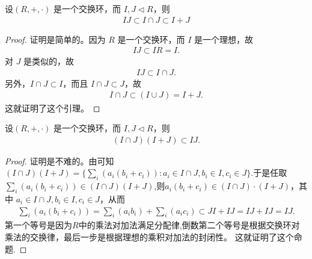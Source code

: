 \documentclass[../../main.tex]{subfiles}
\begin{document}
\begin{lemma}\label{lemma:IJ、I与J的交、I+J的关系}
设$(R, +, \cdot)$ 是一个交换环，而 $I, J \lhd R$，则
\begin{align*}
IJ \subset I \cap J \subset I + J
\end{align*}
\end{lemma}
\begin{proof}
证明是简单的。因为 $R$ 是一个交换环，而 $I$ 是一个理想，故
\begin{align*}
IJ \subset IR = I.
\end{align*}
对 $J$ 是类似的，故
\begin{align*}
IJ \subset I \cap J.
\end{align*}
另外，$I \cap J \subset I$，而且 $I \cap J \subset J$，故
\begin{align*}
I \cap J \subset (I \cup J) = I + J.
\end{align*}
这就证明了这个引理。

\end{proof}

\begin{lemma}\label{lemma:I与J的交、I+J的乘积包含于IJ}
设$(R, +, \cdot)$ 是一个交换环，而 $I, J \lhd R$，则
\begin{align*}
(I \cap J)(I + J) \subset IJ .
\end{align*}
\end{lemma}
\begin{proof}
证明是不难的。由可知$(I \cap J)(I + J)=\{\sum_i (a_i(b_i + c_i)):a_i \in I \cap J, b_i \in I, c_i \in J\}.$于是任取$\sum_i (a_i(b_i + c_i)) \in (I \cap J)(I + J)$,则$a_i(b_i + c_i) \in (I \cap J)\cdot (I + J)$，其中 $a_i \in I \cap J, b_i \in I, c_i \in J$，从而
\begin{align*}
\sum_i (a_i(b_i + c_i)) = \sum_i (a_ib_i) + \sum_i (a_ic_i) \subset JI + IJ = IJ + IJ = IJ .
\end{align*}
第一个等号是因为$R$中的乘法对加法满足分配律,倒数第二个等号是根据交换环对乘法的交换律，最后一步是根据理想的乘积对加法的封闭性。
这就证明了这个命题.

\end{proof}
\end{document}
